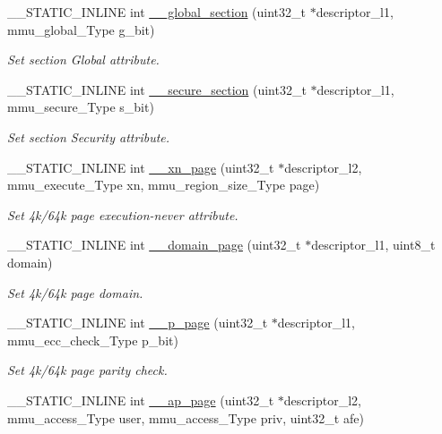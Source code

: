 \begin{DoxyCompactItemize}
\+\_\+\+\_\+\+S\+T\+A\+T\+I\+C\+\_\+\+I\+N\+L\+I\+NE int \hyperlink{group__MMU__Functions_gab9ebaae8d22bfbff6ce2909c778ca43a}{\+\_\+\+\_\+global\+\_\+section} (uint32\+\_\+t $\ast$descriptor\+\_\+l1, mmu\+\_\+global\+\_\+\+Type g\+\_\+bit)
\begin{DoxyCompactList}\small\item\em Set section Global attribute. \end{DoxyCompactList}\item 
\+\_\+\+\_\+\+S\+T\+A\+T\+I\+C\+\_\+\+I\+N\+L\+I\+NE int \hyperlink{group__MMU__Functions_gac1430230710ffbf0f3f279f118b0f8b3}{\+\_\+\+\_\+secure\+\_\+section} (uint32\+\_\+t $\ast$descriptor\+\_\+l1, mmu\+\_\+secure\+\_\+\+Type s\+\_\+bit)
\begin{DoxyCompactList}\small\item\em Set section Security attribute. \end{DoxyCompactList}\item 
\+\_\+\+\_\+\+S\+T\+A\+T\+I\+C\+\_\+\+I\+N\+L\+I\+NE int \hyperlink{group__MMU__Functions_ga29333191c243fead911c3a25586583ef}{\+\_\+\+\_\+xn\+\_\+page} (uint32\+\_\+t $\ast$descriptor\+\_\+l2, mmu\+\_\+execute\+\_\+\+Type xn, mmu\+\_\+region\+\_\+size\+\_\+\+Type page)
\begin{DoxyCompactList}\small\item\em Set 4k/64k page execution-\/never attribute. \end{DoxyCompactList}\item 
\+\_\+\+\_\+\+S\+T\+A\+T\+I\+C\+\_\+\+I\+N\+L\+I\+NE int \hyperlink{group__MMU__Functions_gaf6ade9af49080e011c6ac9ad46b4993f}{\+\_\+\+\_\+domain\+\_\+page} (uint32\+\_\+t $\ast$descriptor\+\_\+l1, uint8\+\_\+t domain)
\begin{DoxyCompactList}\small\item\em Set 4k/64k page domain. \end{DoxyCompactList}\item 
\+\_\+\+\_\+\+S\+T\+A\+T\+I\+C\+\_\+\+I\+N\+L\+I\+NE int \hyperlink{group__MMU__Functions_gad99cf050a448feeb534988003e38b861}{\+\_\+\+\_\+p\+\_\+page} (uint32\+\_\+t $\ast$descriptor\+\_\+l1, mmu\+\_\+ecc\+\_\+check\+\_\+\+Type p\+\_\+bit)
\begin{DoxyCompactList}\small\item\em Set 4k/64k page parity check. \end{DoxyCompactList}\item 
\+\_\+\+\_\+\+S\+T\+A\+T\+I\+C\+\_\+\+I\+N\+L\+I\+NE int \hyperlink{group__MMU__Functions_gaf87456022881530f30354c3e84955bf8}{\+\_\+\+\_\+ap\+\_\+page} (uint32\+\_\+t $\ast$descriptor\+\_\+l2, mmu\+\_\+access\+\_\+\+Type user, mmu\+\_\+access\+\_\+\+Type priv, uint32\+\_\+t afe)

\end{DoxyCompactItemize}
